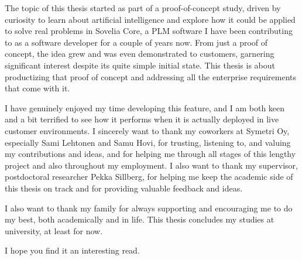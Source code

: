 The topic of this thesis started as part of a proof-of-concept study, driven by curiosity to learn about artificial intelligence and explore how it could be applied to solve real problems in Sovelia Core, a PLM software I have been contributing to as a software developer for a couple of years now. From just a proof of concept, the idea grew and was even demonstrated to customers, garnering significant interest despite its quite simple initial state. This thesis is about productizing that proof of concept and addressing all the enterprise requirements that come with it.

I have genuinely enjoyed my time developing this feature, and I am both keen and a bit terrified to see how it performs when it is actually deployed in live customer environments. I sincerely want to thank my coworkers at Symetri Oy, especially Sami Lehtonen and Samu Hovi, for trusting, listening to, and valuing my contributions and ideas, and for helping me through all stages of this lengthy project and also throughout my employment. I also want to thank my supervisor, postdoctoral researcher Pekka Sillberg, for helping me keep the academic side of this thesis on track and for providing valuable feedback and ideas.

I also want to thank my family for always supporting and encouraging me to do my best, both academically and in life. This thesis concludes my studies at university, at least for now.

I hope you find it an interesting read.